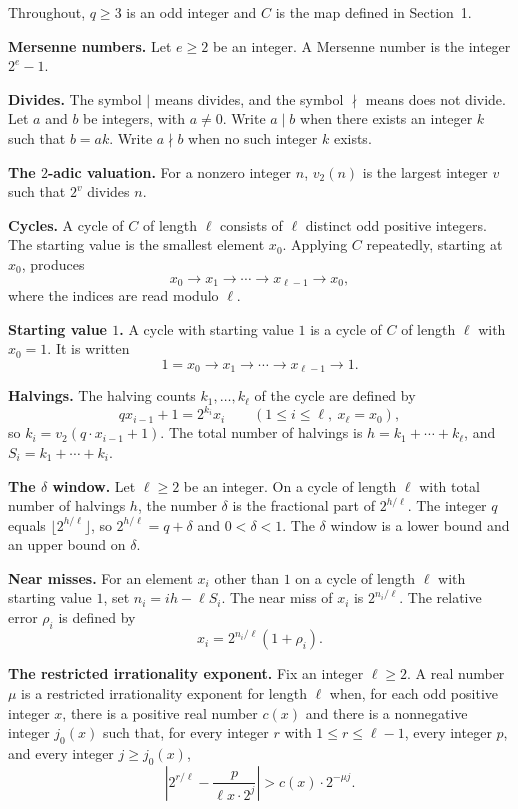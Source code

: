 \documentclass[11pt]{article}
\newcommand{\topic}[1]{\par\noindent\textbf{#1}}
\begin{document}
Throughout, $q \ge 3$ is an odd integer and $C$ is the map defined in Section~1.

\topic{Mersenne numbers.}
Let $e \ge 2$ be an integer.
A Mersenne number is the integer $2^e - 1$.

\topic{Divides.}
The symbol $\mid$ means divides, and the symbol $\nmid$ means does not divide.
Let $a$ and $b$ be integers, with $a \ne 0$.
Write $a \mid b$ when there exists an integer $k$ such that $b = ak$.
Write $a \nmid b$ when no such integer $k$ exists.

\topic{The $2$-adic valuation.}
For a nonzero integer $n$, $v_2(n)$ is the largest integer $v$ such that $2^v$ divides $n$.

\topic{Cycles.}
A cycle of $C$ of length $\ell$ consists of $\ell$ distinct odd positive integers.
The starting value is the smallest element $x_0$.
Applying $C$ repeatedly, starting at $x_0$, produces
\[
x_0 \to x_1 \to \cdots \to x_{\ell-1} \to x_0,
\]
where the indices are read modulo $\ell$.

\topic{Starting value $1$.}
A cycle with starting value $1$ is a cycle of $C$ of length $\ell$ with $x_0 = 1$.
It is written
\[
1 = x_0 \to x_1 \to \cdots \to x_{\ell-1} \to 1.
\]

\topic{Halvings.}
The halving counts $k_1, \ldots, k_\ell$ of the cycle are defined by
\[
q x_{i-1} + 1 = 2^{k_i} x_i
\qquad (1 \le i \le \ell,\ x_\ell = x_0),
\]
so $k_i = v_2(q \cdot x_{i-1} + 1)$.
The total number of halvings is $h = k_1 + \cdots + k_\ell$, and $S_i = k_1 + \cdots + k_i$.

\topic{The $\delta$ window.}
Let $\ell \ge 2$ be an integer.
On a cycle of length $\ell$ with total number of halvings $h$, the number $\delta$ is the fractional part of $2^{h/\ell}$.
The integer $q$ equals $\lfloor 2^{h/\ell} \rfloor$, so $2^{h/\ell} = q + \delta$ and $0 < \delta < 1$.
The $\delta$ window is a lower bound and an upper bound on $\delta$.

\topic{Near misses.}
For an element $x_i$ other than $1$ on a cycle of length $\ell$ with starting value $1$, set $n_i = ih - \ell S_i$.
The near miss of $x_i$ is $2^{n_i/\ell}$.
The relative error $\rho_i$ is defined by
\[
x_i = 2^{n_i/\ell}(1 + \rho_i).
\]

\topic{The restricted irrationality exponent.}
Fix an integer $\ell \ge 2$.
A real number $\mu$ is a restricted irrationality exponent for length $\ell$ when, for each odd positive integer $x$, there is a positive real number $c(x)$ and there is a nonnegative integer $j_0(x)$ such that, for every integer $r$ with $1 \le r \le \ell - 1$, every integer $p$, and every integer $j \ge j_0(x)$,
\[
\left| 2^{r/\ell} - \frac{p}{\ell x \cdot 2^j} \right| > c(x) \cdot 2^{-\mu j}.
\]
\end{document}
